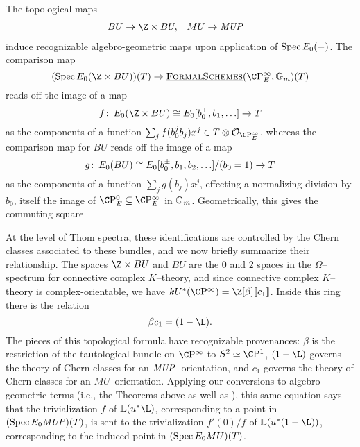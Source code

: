 \begin{remark}\label{BUtoBUZ}
The topological maps
\begin{align*}
BU & \to \Z \times BU, &
MU & \to \MUP
\end{align*}
induce recognizable algebro-geometric maps upon application of \(\operatorname{Spec} E_0(-)\).  The comparison map \[(\Spec E_0(\Z \times BU))(T) \to \InternalHom{FormalSchemes}(\CP^\infty_E, \Gm)(T)\] reads off the image of a map \[f\co E_0(\Z \times BU) \cong E_0[b_0^\pm, b_1, \ldots] \to T\] as the components of a function \(\sum_j f(b_0^j b_j) x^j \in T \otimes \sheaf O_{\CP^\infty_E}\), whereas the comparison map for \(BU\) reads off the image of a map \[g\colon\thinspace E_0(BU) \cong E_0[b_0^\pm, b_1, b_2, \ldots] / (b_0 = 1) \to T\] as the components of a function \(\sum_j g(b_j)x^j\), effecting a normalizing division by \(b_0\), itself the image of \(\CP^0_E \subseteq \CP^\infty_E\) in \(\mathbb G_m\).  Geometrically, this gives the commuting square
\begin{center}
\end{center}

At the level of Thom spectra, these identifications are controlled by the Chern classes associated to these bundles, and we now briefly summarize their relationship.  The spaces \(\Z \times BU\) and \(BU\) are the \(0\){\th} and \(2\){\nd} spaces in the \(\Omega\)--spectrum for connective complex \(K\)--theory, and since connective complex \(K\)--theory is complex-orientable, we have \(kU^*(\CP^\infty) = \Z[\beta]\ps{c_1}\).  Inside this ring there is the relation \[\beta c_1 = (1 - \L).\]  The pieces of this topological formula have recognizable provenances: \(\beta\) is the restriction of the tautological bundle on \(\CP^\infty\) to \(S^2 \simeq \CP^1\), \((1 - \L)\) governs the theory of Chern classes for an \(\mathit{MUP}\)--orientation, and \(c_1\) governs the theory of Chern classes for an \(MU\)--orientation.  Applying our conversions to algebro-geometric terms (i.e., the Theorems above as well as ), this same equation says that the trivialization \(f\) of \(\ThomSheaf{u^* \L}\), corresponding to a point in \((\operatorname{Spec} E_0 \mathit{MUP})(T)\), is sent to the trivialization \(f'(0) / f\) of \(\ThomSheaf{u^*(1 - \L)}\), corresponding to the induced point in \((\operatorname{Spec} E_0 MU)(T)\).
\end{remark}


